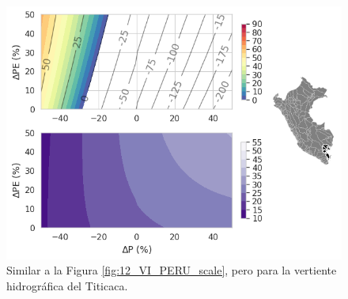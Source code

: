 \begin{figure}[ht!]
	\includegraphics[scale=.85]{Images/12_VI_Nivel_scale_Titicaca.png}
	\centering
	\caption{Similar a la Figura \ref{fig:12_VI_PERU_scale}, pero para la vertiente hidrográfica del Titicaca.}
	\label{fig:12_VI_Nivel_scale_Titicaca}
\end{figure}

